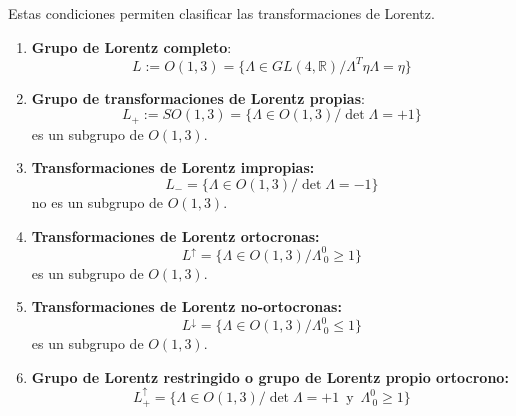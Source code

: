 Estas condiciones permiten clasificar las transformaciones de Lorentz. 
\begin{enumerate}
	\item \textbf{Grupo de Lorentz completo}:
	\begin{equation}
  L:=O(1,3)=\{\Lambda\in GL(4,\mathbb{R})/\Lambda^T\eta\Lambda=\eta \}
\end{equation}
\item \textbf{Grupo de transformaciones de Lorentz propias}:
 \begin{equation}
  L_+:=SO(1,3)=\{\Lambda\in O(1,3)/\det\Lambda=+1\}
\end{equation}
es un subgrupo de $O(1,3)$.
\item \textbf{Transformaciones de Lorentz impropias:}
\begin{equation}
  L_-=\{\Lambda\in O(1,3)/\det\Lambda=-1\}
\end{equation}
no es un subgrupo de $O(1,3)$.
\item \textbf{Transformaciones de Lorentz ortocronas:}
\begin{equation}
  L^\uparrow =\{\Lambda\in O(1,3)/\Lambda^0_{~0}\geq 1\}
\end{equation}
es un subgrupo de $O(1,3)$.
\item \textbf{Transformaciones de Lorentz no-ortocronas:}
\begin{equation}
  L^\downarrow =\{\Lambda\in O(1,3)/\Lambda^0_{~0}\leq 1\}
\end{equation}
es un subgrupo de $O(1,3)$.
\item \textbf{Grupo de Lorentz restringido o grupo de Lorentz propio ortocrono:}
 \begin{equation}
  L^\uparrow_+ =\{\Lambda\in O(1,3)/\det\Lambda=+1\,  \text{  y  }\, \Lambda^0_{~0}\geq 1\}
\end{equation}
\end{enumerate}

